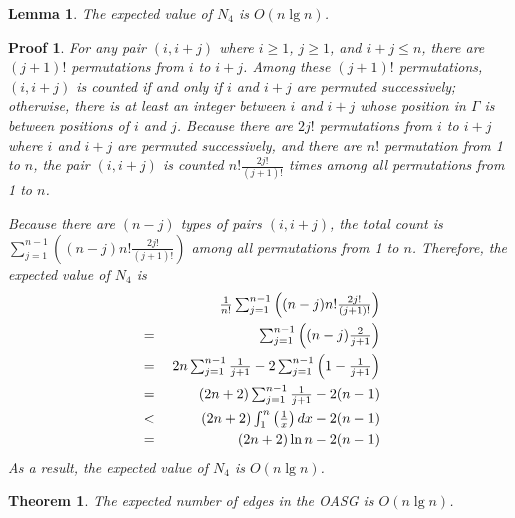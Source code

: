 \documentclass[]{article}
\newtheorem{Lemma}{Lemma}
\newtheorem{Proof}{Proof}
\newtheorem{Theorem}{Theorem}
\begin{document}
\begin{qunlist}
{{\begin{Lemma}\label{lemma:n4}
The expected value of $N_4$ is $O(n\lg n)$.
\end{Lemma}

\begin{Proof}
For any pair $(i,i+j)$ where $i\geq 1$, $j\geq 1$, and $i+j\leq n$, there are $(j+1)!$ permutations from $i$ to $i+j$. Among these $(j+1)!$ permutations, $(i,i+j)$ is counted if and only if $i$ and $i+j$ are permuted successively; otherwise, there is at least an integer between $i$ and $i+j$ whose position in $\Gamma$ is between positions of $i$ and $j$. Because there are $2j!$ permutations from $i$ to $i+j$ where $i$ and $i+j$ are permuted successively, and there are $n!$ permutation from 1 to $n$, the pair $(i,i+j)$ is counted $n!\frac{2j!}{(j+1)!}$ times among all permutations from 1 to $n$.

Because there are $(n-j)$ types of pairs $(i,i+j)$, the total count is $\sum_{j=1}^{n-1}((n-j)n!\frac{2j!}{(j+1)!})$ among all permutations from 1 to $n$. Therefore, the expected value of $N_4$ is
\begin{eqnarray*}
 & {\textstyle        } & {\textstyle \frac{1}{n!}\sum_{j=1}^{n-1}\left((n-j)n!\frac{2j!}{(j+1)!}\right)}            \nonumber\\
 & {\textstyle { }={ }} & {\textstyle \sum_{j=1}^{n-1}\left((n-j)\frac{2}{j+1}\right)}                               \nonumber\\
 & {\textstyle { }={ }} & {\textstyle 2n\sum_{j=1}^{n-1}\frac{1}{j+1}-2\sum_{j=1}^{n-1}\left(1-\frac{1}{j+1}\right)} \nonumber\\
 & {\textstyle { }={ }} & {\textstyle (2n+2)\sum_{j=1}^{n-1}\frac{1}{j+1}-2(n-1)}                                    \nonumber\\
 & {\textstyle { }<{ }} & {\textstyle (2n+2)\int_1^n\left(\frac{1}{x}\right)dx-2(n-1)}                             \nonumber\\
 & {\textstyle { }={ }} & {\textstyle (2n+2)\ln n-2(n-1)}                                                           \nonumber
\end{eqnarray*}
As a result, the expected value of $N_4$ is $O(n\lg n)$.
\end{Proof}

\begin{Theorem}\label{theorem:edge-random-case}
The expected number of edges in the OASG is $O(n\lg n)$.
\end{Theorem}

}}
\end{qunlist}
\end{document}
